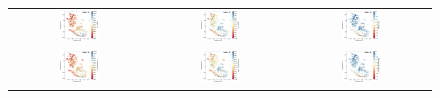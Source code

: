 \documentclass{aa}
\begin{document}
\begin{appendix}
\begin{figure}[htbp]
    \centering
    \begin{tabular}{ccc}
        \includegraphics[width=0.3\textwidth]{Plots/tsne_params/tsne_R5_Teff_GES.pdf} & \includegraphics[width=0.3\textwidth]{Plots/tsne_params/tsne_R5_logg_GES.pdf} & \includegraphics[width=0.3\textwidth]{Plots/tsne_params/tsne_R5_FeH_GES.pdf} \\
        \includegraphics[width=0.3\textwidth]{Plots/tsne_params/tsne_R5_Teff_GaiaXGBoost.pdf} & \includegraphics[width=0.3\textwidth]{Plots/tsne_params/tsne_R5_logg_GaiaXGBoost.pdf} & \includegraphics[width=0.3\textwidth]{Plots/tsne_params/tsne_R5_FeH_GaiaXGBoost.pdf} \\

\end{tabular}
\end{figure}
\end{appendix}
\end{document}
